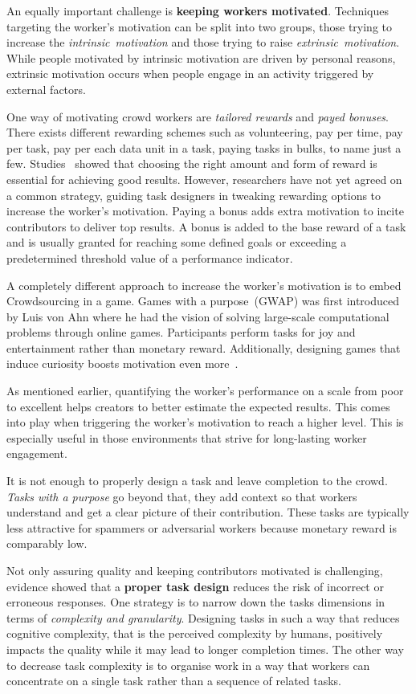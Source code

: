 \documentclass[draft,final]{vutinfth} %
\begin{document}
An equally important challenge is \textbf{keeping workers motivated}. Techniques targeting the worker's motivation can be split into two groups, those trying to increase the \emph{intrinsic~motivation} and those trying to raise \emph{extrinsic~motivation}. While people motivated by intrinsic motivation are driven by personal reasons, extrinsic motivation occurs when people engage in an activity triggered by external factors. 

One way of motivating crowd workers are \textit{tailored rewards} and \textit{payed bonuses}. There exists different rewarding schemes such as volunteering, pay per time, pay per task, pay per each data unit in a task, paying tasks in bulks, to name just a few. Studies~\cite{faradani2011, ho2015} showed that choosing the right amount and form of reward is essential for achieving good results. However, researchers have not yet agreed on a common strategy, guiding task designers in tweaking rewarding options to increase the worker's motivation. 
Paying a bonus adds extra motivation to incite contributors to deliver top results. A bonus is added to the base reward of a task and is usually granted for reaching some defined goals or exceeding a predetermined threshold value of a performance indicator. 

A completely different approach to increase the worker's motivation is to embed Crowdsourcing in a game. Games with a purpose~(GWAP) was first introduced by Luis von Ahn\cite{ahn2006} where he had the vision of solving large-scale computational problems through online games. Participants perform tasks for joy and entertainment rather than monetary reward. Additionally, designing games that induce curiosity boosts motivation even more~\cite{law2016}. 

As mentioned earlier, quantifying the worker's performance on a scale from poor to excellent helps creators to better estimate the expected results. This comes into play when triggering the worker's motivation to reach a higher level. This is especially useful in those environments that strive for long-lasting worker engagement. 

It is not enough to properly design a task and leave completion to the crowd. \emph{Tasks with a purpose} go beyond that, they add context so that workers understand and get a clear picture of their contribution. These tasks are typically less attractive for spammers or adversarial workers because monetary reward is comparably low. 

Not only assuring quality and keeping contributors motivated is challenging, evidence showed that a \textbf{proper task design} reduces the risk of incorrect or erroneous responses. One strategy is to narrow down the tasks dimensions in terms of \emph{complexity and granularity}. Designing tasks in such a way that reduces cognitive complexity, that is the perceived complexity by humans, positively impacts the quality while it may lead to longer completion times. The other way to decrease task complexity is to organise work in a way that workers can concentrate on a single task rather than a sequence of related tasks.  
\end{document}
